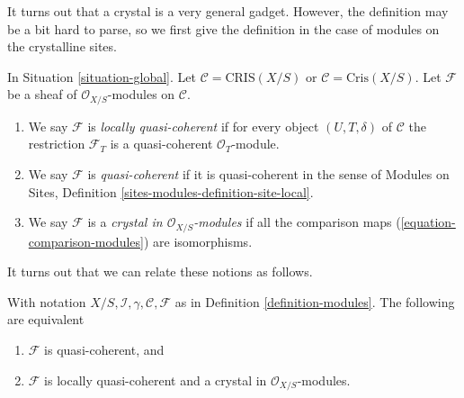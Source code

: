 \noindent
It turns out that a crystal is a very general gadget. However, the
definition may be a bit hard to parse, so we first give the definition
in the case of modules on the crystalline sites.

\begin{definition}
\label{definition-modules}
In Situation \ref{situation-global}.
Let $\mathcal{C} = \text{CRIS}(X/S)$ or $\mathcal{C} = \text{Cris}(X/S)$.
Let $\mathcal{F}$ be a sheaf of $\mathcal{O}_{X/S}$-modules on $\mathcal{C}$.
\begin{enumerate}
\item We say $\mathcal{F}$ is {\it locally quasi-coherent} if for every
object $(U, T, \delta)$ of $\mathcal{C}$ the restriction $\mathcal{F}_T$
is a quasi-coherent $\mathcal{O}_T$-module.
\item We say $\mathcal{F}$ is {\it quasi-coherent} if it is quasi-coherent
in the sense of
Modules on Sites, Definition \ref{sites-modules-definition-site-local}.
\item We say $\mathcal{F}$ is a {\it crystal in $\mathcal{O}_{X/S}$-modules}
if all the comparison maps (\ref{equation-comparison-modules}) are
isomorphisms.
\end{enumerate}
\end{definition}

\noindent
It turns out that we can relate these notions as follows.

\begin{lemma}
\label{lemma-crystal-quasi-coherent-modules}
With notation $X/S, \mathcal{I}, \gamma, \mathcal{C}, \mathcal{F}$
as in Definition \ref{definition-modules}. The following are equivalent
\begin{enumerate}
\item $\mathcal{F}$ is quasi-coherent, and
\item $\mathcal{F}$ is locally quasi-coherent and a crystal in
$\mathcal{O}_{X/S}$-modules.
\end{enumerate}
\end{lemma}

